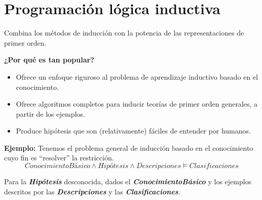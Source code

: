 \documentclass[12 pt, a4paper]{article}
\begin{document}
	 \section{Programación lógica inductiva}
	 	Combina los métodos de inducción con la potencia de las representaciones de primer orden.
	 	
	 	\textbf{¿Por qué es tan popular?}
	 		\begin{itemize}
	 			\item Ofrece un enfoque riguroso al problema de aprendizaje inductivo basado en el conocimiento.\\
	 			\item Ofrece algoritmos completos para inducir teorías de primer orden generales, a partir de los ejemplos.\\
	 			\item Produce hipótesis que son (relativamente) fáciles de entender por humanos.\\
	 		\end{itemize}
	 		\textbf{Ejemplo:} Tenemos el problema general de inducción basado en el conocimiento cuyo fin es ``resolver'' la restricción.			
	 		$$\textit{ConocimientoBásico} \land \textit{Hipótesis}\land Descripciones \models Clasificaciones$$
	 		
	 		Para la \textbf{\textit{Hipótesis}} desconocida, dados el \textbf{\textit{ConocimientoBásico}} y los ejemplos descritos por las \textbf{\textit{Descripciones}} y las \textbf{\textit{Clasificaciones}}. 
	 		
\end{document}
